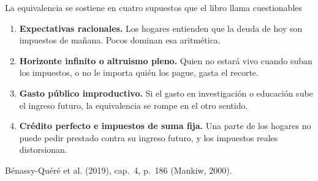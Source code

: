 \documentclass[aspectratio=169,11pt]{beamer}
\newcommand{\fuente}[1]{\par\vfill{\small\color{cGris}#1\par}}
\newcommand{\BQ}{Bénassy-Quéré et al. (2019), cap.~4}
\begin{document}
\begin{frame}{La equivalencia se sostiene en cuatro supuestos que el libro llama cuestionables}
  \begin{enumerate}
    \item<1-> \textbf{Expectativas racionales.} Los hogares entienden que la deuda de hoy son impuestos de mañana. Pocos dominan esa aritmética.
    \item<2-> \textbf{Horizonte infinito o altruismo pleno.} Quien no estará vivo cuando suban los impuestos, o no le importa quién los pague, gasta el recorte.
    \item<3-> \textbf{Gasto público improductivo.} Si el gasto en investigación o educación sube el ingreso futuro, la equivalencia se rompe en el otro sentido.
    \item<4-> \textbf{Crédito perfecto e impuestos de suma fija.} Una parte de los hogares no puede pedir prestado contra su ingreso futuro, y los impuestos reales distorsionan.
  \end{enumerate}
  \fuente{\BQ, p.~186 (Mankiw, 2000).}
\end{frame}
\end{document}
